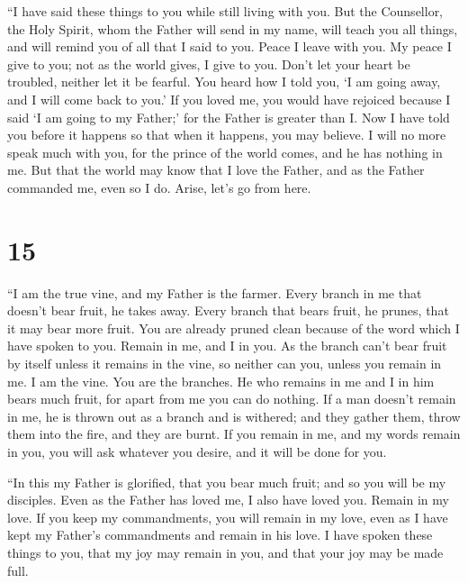  ``I have said these things to you while still living
with you.  But the Counsellor, the Holy Spirit, whom the
Father will send in my name, will teach you all things, and will remind
you of all that I said to you.  Peace I leave with you.
My peace I give to you; not as the world gives, I give to you. Don't let
your heart be troubled, neither let it be fearful.  You
heard how I told you, `I am going away, and I will come back to you.' If
you loved me, you would have rejoiced because I said `I am going to my
Father;' for the Father is greater than I.  Now I have
told you before it happens so that when it happens, you may believe.
 I will no more speak much with you, for the prince of
the world comes, and he has nothing in me.  But that the
world may know that I love the Father, and as the Father commanded me,
even so I do. Arise, let's go from here.

\hypertarget{section-14}{%
\section{15}\label{section-14}}

 ``I am the true vine, and my Father is the farmer.
 Every branch in me that doesn't bear fruit, he takes
away. Every branch that bears fruit, he prunes, that it may bear more
fruit.  You are already pruned clean because of the word
which I have spoken to you.  Remain in me, and I in you.
As the branch can't bear fruit by itself unless it remains in the vine,
so neither can you, unless you remain in me.  I am the
vine. You are the branches. He who remains in me and I in him bears much
fruit, for apart from me you can do nothing.  If a man
doesn't remain in me, he is thrown out as a branch and is withered; and
they gather them, throw them into the fire, and they are burnt.
 If you remain in me, and my words remain in you, you will
ask whatever you desire, and it will be done for you.

 ``In this my Father is glorified, that you bear much
fruit; and so you will be my disciples.  Even as the
Father has loved me, I also have loved you. Remain in my love.
 If you keep my commandments, you will remain in my love,
even as I have kept my Father's commandments and remain in his love.
 I have spoken these things to you, that my joy may
remain in you, and that your joy may be made full.

